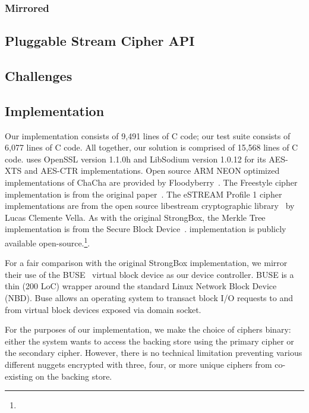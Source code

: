\subsubsection{Mirrored}


\subsection{Pluggable Stream Cipher API}


\subsection{Challenges}



\subsection{Implementation}

Our \SYSTEM{} implementation consists of 9,491 lines of C code; our test suite
consists of 6,077 lines of C code. All together, our solution is comprised of
15,568 lines of C code. \SYSTEM{} uses OpenSSL version 1.1.0h and LibSodium
version 1.0.12 for its AES-XTS and AES-CTR implementations. Open source ARM NEON
optimized implementations of ChaCha are provided by
Floodyberry~\cite{Floodyberry}. The Freestyle cipher implementation is from the
original paper~\cite{Freestyle}. The eSTREAM Profile 1 cipher implementations
are from the open source libestream cryptographic library~\cite{libestream} by
Lucas Clemente Vella. As with the original StrongBox, the Merkle Tree
implementation is from the Secure Block Device~\cite{SBD}. \SYSTEM{}
implementation is publicly available open-source.\footnote{\SystemURI}.

For a fair comparison with the original StrongBox implementation, we mirror
their use of the BUSE~\cite{BUSE} virtual block device as our device controller.
BUSE is a thin (200 LoC) wrapper around the standard Linux Network Block Device
(NBD). Buse allows an operating system to transact block I/O requests to and
from virtual block devices exposed via domain socket.

For the purposes of our implementation, we make the choice of ciphers binary:
either the system wants \SYSTEM{} to access the backing store using the primary
cipher or the secondary cipher. However, there is no technical limitation
preventing various different nuggets encrypted with three, four, or more unique
ciphers from co-existing on the backing store.

